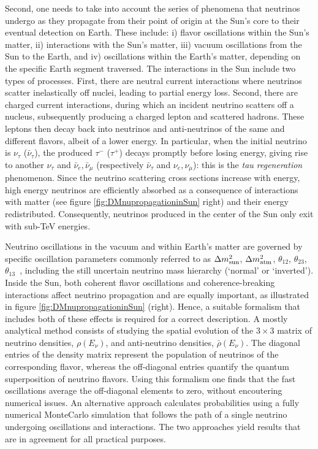 Second, one needs to take into account 
the series of phenomena that neutrinos undergo as they propagate from their point of origin at the Sun's core to their eventual detection on Earth.
These include: i) flavor oscillations within the Sun's matter, ii) interactions with the Sun's matter, iii) vacuum oscillations from the Sun to the Earth, and iv) oscillations within the Earth's matter, depending on the specific Earth segment traversed.
The interactions in the Sun include two types of processes.
First, there are neutral current interactions where neutrinos scatter inelastically off nuclei, leading to partial energy loss. 
 Second, there are charged current interactions, during which an incident neutrino scatters off a nucleus, subsequently producing a charged lepton and scattered hadrons.
 These leptons then decay back into neutrinos and anti-neutrinos of the same and different flavors, albeit of a lower energy. 
 In particular, when the initial neutrino is $\nu_\tau$ ($\bar\nu_\tau$), the produced $\tau^-$ ($\tau^+$) decays promptly before losing energy, giving rise to another $\nu_\tau$ and $\bar\nu_e, \bar\nu_\mu$ (respectively $\bar \nu_\tau$ and $\nu_e, \nu_\mu$): this is the {\em tau regeneration} phenomenon. 
Since the neutrino scattering cross sections increase with energy, high energy neutrinos are efficiently absorbed as a consequence of interactions with matter (see figure \ref{fig:DMnupropagationinSun} right) and their energy redistributed. Consequently, neutrinos produced in the center of the Sun only exit with sub-TeV energies.


Neutrino oscillations in the vacuum and within Earth's matter are governed by specific oscillation parameters commonly referred to as
$\Delta m^2_{\rm sun}$,
$\Delta m^2_{\rm atm}$, $\theta_{12}$, $\theta_{23}$, $\theta_{13}$~\cite{NuOsc}, 
including the still uncertain neutrino mass hierarchy (`normal' or `inverted'). Inside the Sun, both coherent flavor oscillations and coherence-breaking interactions affect  neutrino propagation and are equally important, as illustrated in figure \ref{fig:DMnupropagationinSun} (right). 
Hence, a suitable formalism that includes both of these effects is required for a correct description. 
A mostly analytical method consists of studying the spatial evolution of the $3 \times 3$ matrix of neutrino densities, $\rho(E_\nu)$, and anti-neutrino densities, $\bar\rho(E_\nu)$. The diagonal entries of the density matrix represent the population of neutrinos of the corresponding flavor, whereas the off-diagonal entries quantify the quantum superposition of neutrino flavors. 
Using this formalism one finds that the fast oscillations average the off-diagonal elements to zero, without encoutering numerical issues.
An alternative approach calculates probabilities using 
a  fully numerical  MonteCarlo simulation that follows the path of a single neutrino undergoing oscillations and interactions.
The two approaches yield results that are in agreement for all practical purposes.

